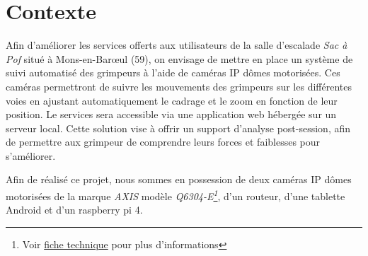 \documentclass[a4paper, 11pt, french]{article}
\begin{document}
\begin{titlepage}
\begin{titlepage}
\begin{center}
          \vspace{1cm}
         
        \end{center}
      \end{titlepage}
    
    \normalsize
   
\end{titlepage}


\setcounter{secnumdepth}{3}
\setcounter{tocdepth}{3}
\startcontents[sections]

\tableofcontents
\newpage


\section{Contexte}
Afin d'améliorer les services offerts aux utilisateurs de la salle d’escalade \textit{Sac à Pof} situé à  Mons-en-Barœul (59), on envisage de mettre en place un système de suivi automatisé des grimpeurs à l'aide de caméras IP dômes motorisées. Ces caméras permettront de suivre les mouvements des grimpeurs sur les différentes voies en ajustant automatiquement le cadrage et le zoom en fonction de leur position. Le services sera accessible via une application web hébergée sur un serveur local. Cette solution vise à offrir un support d'analyse post-session, afin de permettre aux grimpeur de comprendre leurs forces et faiblesses pour s'améliorer.

Afin de réalisé ce projet, nous sommes en possession de deux caméras IP dômes motorisées de la marque \textit{AXIS} modèle \textit{Q6304-E\footnote{Voir \href{https://www.axis.com/dam/public/11/e4/20/cam\%C3\%A9ra-r\%C3\%A9seau-\%C3\%A0-d\%C3\%B4me-ptz-axis-q6034-e-fr-FR-201515.pdf}{fiche technique} pour plus d'informations}}, d'un routeur, d'une tablette Android et d'un raspberry pi 4.
\end{document}
